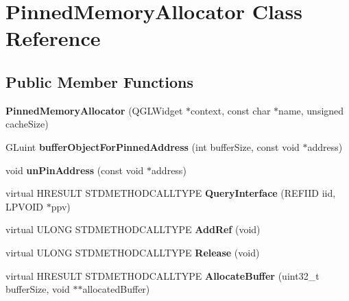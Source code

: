 \hypertarget{classPinnedMemoryAllocator}{
\section{PinnedMemoryAllocator Class Reference}
\label{classPinnedMemoryAllocator}
}
\subsection*{Public Member Functions}
\begin{DoxyCompactItemize}
\item 
\hypertarget{classPinnedMemoryAllocator_aad2d856c8c144dca3c2274dbbc955748}{
{\bfseries PinnedMemoryAllocator} (QGLWidget $\ast$context, const char $\ast$name, unsigned cacheSize)}
\label{classPinnedMemoryAllocator_aad2d856c8c144dca3c2274dbbc955748}

\item 
\hypertarget{classPinnedMemoryAllocator_a7fbcbdfcc5a9c1a9c8cdd9c9bd018db4}{
GLuint {\bfseries bufferObjectForPinnedAddress} (int bufferSize, const void $\ast$address)}
\label{classPinnedMemoryAllocator_a7fbcbdfcc5a9c1a9c8cdd9c9bd018db4}

\item 
\hypertarget{classPinnedMemoryAllocator_a989b461a86bc64a045627276520908c4}{
void {\bfseries unPinAddress} (const void $\ast$address)}
\label{classPinnedMemoryAllocator_a989b461a86bc64a045627276520908c4}

\item 
\hypertarget{classPinnedMemoryAllocator_a8994f08854a3c20c183285a11185edce}{
virtual HRESULT STDMETHODCALLTYPE {\bfseries QueryInterface} (REFIID iid, LPVOID $\ast$ppv)}
\label{classPinnedMemoryAllocator_a8994f08854a3c20c183285a11185edce}

\item 
\hypertarget{classPinnedMemoryAllocator_ad64b742fa613fd34992b740a84b174e1}{
virtual ULONG STDMETHODCALLTYPE {\bfseries AddRef} (void)}
\label{classPinnedMemoryAllocator_ad64b742fa613fd34992b740a84b174e1}

\item 
\hypertarget{classPinnedMemoryAllocator_abf0039df0bd78b1a18ce310ac4f3c089}{
virtual ULONG STDMETHODCALLTYPE {\bfseries Release} (void)}
\label{classPinnedMemoryAllocator_abf0039df0bd78b1a18ce310ac4f3c089}

\item 
\hypertarget{classPinnedMemoryAllocator_a9de61e0e5eaa71e0c2987d9f26209e08}{
virtual HRESULT STDMETHODCALLTYPE {\bfseries AllocateBuffer} (uint32\_\-t bufferSize, void $\ast$$\ast$allocatedBuffer)}
\label{classPinnedMemoryAllocator_a9de61e0e5eaa71e0c2987d9f26209e08}


\end{DoxyCompactItemize}
